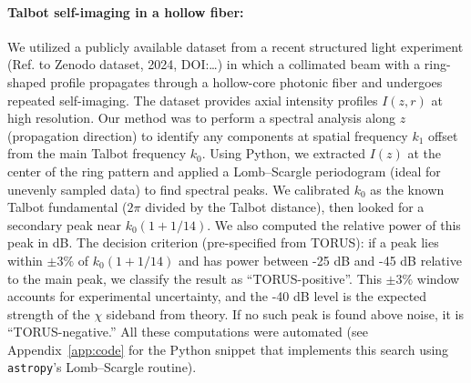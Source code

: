 \documentclass[12pt]{article}
\begin{document}
\paragraph{Talbot self-imaging in a hollow fiber:} We utilized a publicly available dataset from a recent structured light experiment (Ref. to Zenodo dataset, 2024, DOI:…) in which a collimated beam with a ring-shaped profile propagates through a hollow-core photonic fiber and undergoes repeated self-imaging. The dataset provides axial intensity profiles $I(z,r)$ at high resolution. Our method was to perform a spectral analysis along $z$ (propagation direction) to identify any components at spatial frequency $k_1$ offset from the main Talbot frequency $k_0$. Using Python, we extracted $I(z)$ at the center of the ring pattern and applied a Lomb–Scargle periodogram (ideal for unevenly sampled data) to find spectral peaks. We calibrated $k_0$ as the known Talbot fundamental ($2\pi$ divided by the Talbot distance), then looked for a secondary peak near $k_0(1+1/14)$. We also computed the relative power of this peak in dB. The decision criterion (pre-specified from TORUS): if a peak lies within $\pm3\%$ of $k_0(1+1/14)$ and has power between -25 dB and -45 dB relative to the main peak, we classify the result as “TORUS-positive”. This $\pm3\%$ window accounts for experimental uncertainty, and the -40 dB level is the expected strength of the $\chi$ sideband from theory. If no such peak is found above noise, it is “TORUS-negative.” All these computations were automated (see Appendix~\ref{app:code} for the Python snippet that implements this search using \texttt{astropy}’s Lomb–Scargle routine).
\end{document}
